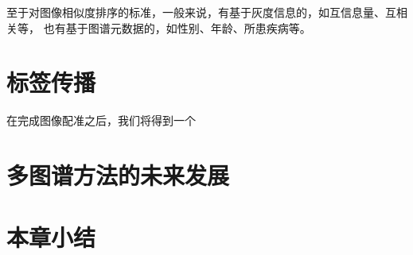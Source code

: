 至于对图像相似度排序的标准，一般来说，有基于灰度信息的，如互信息量、互相关等，
也有基于图谱元数据的，如性别、年龄、所患疾病等。

\section{标签传播}
在完成图像配准之后，我们将得到一个




\section{多图谱方法的未来发展}

\section{本章小结}
